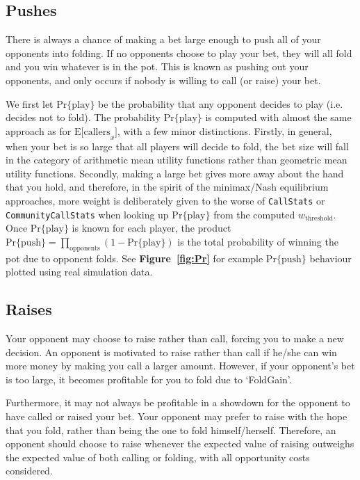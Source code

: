 \subsection{Pushes}
\label{sec:Push}
There is always a chance of making a bet large enough to push all of your opponents into folding.
If no opponents choose to play your bet, they will all fold and you win whatever is in the pot.
This is known as pushing out your opponents, and only occurs if nobody is willing to call (or raise) your bet.

We first let $\mathrm{Pr\{play\}}$ be the probability that any opponent decides to play (i.e. decides not to fold).
The probability $\mathrm{Pr\{play\}}$ is computed with almost the same approach as for $\mathrm{E[callers}_x]$, with a few minor distinctions.
Firstly, in general, when your bet is so large that all players will decide to fold, the bet size will fall in the category of arithmetic mean utility functions rather than geometric mean utility functions.
Secondly, making a large bet gives more away about the hand that you hold, and therefore, in the spirit of the minimax/Nash equilibrium approaches, more weight is deliberately given to the worse of \texttt{CallStats} or \texttt{CommunityCallStats} when looking up $\mathrm{Pr\{play\}}$ from the computed $w_{\mathrm{threshold}}$.
Once $\mathrm{Pr\{play\}}$ is known for each player, the product $\mathrm{Pr\{push\}} = \prod_{\mathrm{opponents}} \left( 1 - \mathrm{Pr\{play\}} \right)$ is the total probability of winning the pot due to opponent folds.
See \textbf{Figure~\ref{fig:Pr}} for example $\mathrm{Pr\{push\}}$ behaviour plotted using real simulation data.


\subsection{Raises}
\label{sec:Raises}
Your opponent may choose to raise rather than call, forcing you to make a new decision.
An opponent is motivated to raise rather than call if he/she can win more money by making you call a larger amount.
However, if your opponent's bet is too large, it becomes profitable for you to fold due to `FoldGain'.

Furthermore, it may not always be profitable in a showdown for the opponent to have called or raised your bet.
Your opponent may prefer to raise with the hope that you fold, rather than being the one to fold himself/herself.
Therefore, an opponent should choose to raise whenever the expected value of raising outweighs the expected value of both calling or folding, with all opportunity costs considered.

